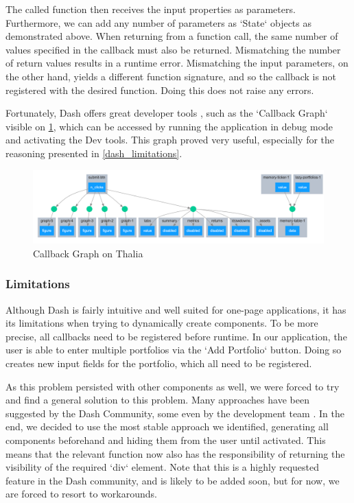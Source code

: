 \documentclass[main.tex]{subfiles}
\begin{document}
The called function then receives the input properties as parameters. Furthermore, we can add any number of parameters as `State` objects as demonstrated above. When returning from a function call, the same number of values specified in the callback must also be returned. Mismatching the number of return values results in a runtime error. Mismatching the input parameters, on the other hand, yields a different function signature, and so the callback is not registered with the desired function. Doing this does not raise any errors.


Fortunately, Dash offers great developer tools \cite{dash_dev_tools}, such as the `Callback Graph` visible on \figurename{\ref{callback_graph}}, which can be accessed by running the application in debug mode and activating the Dev tools. This graph proved very useful, especially for the reasoning presented in \ref{dash_limitations}.

 \begin{figure}[H]
   \centering
   \includegraphics[width=\textwidth,keepaspectratio]{05Coding/05Pictures/callback_graph.png}
   \caption{Callback Graph on Thalia}
   \label{callback_graph}
\end{figure}


\subsubsection*{Limitations}
\label{dash_limitations}

Although Dash is fairly intuitive and well suited for one-page applications, it has its limitations when trying to dynamically create components. To be more precise, all callbacks need to be registered before runtime. In our application, the user is able to enter multiple portfolios via the `Add Portfolio` button. Doing so creates new input fields for the portfolio, which all need to be registered. 

As this problem persisted with other components as well, we were forced to try and find a general solution to this problem. Many approaches have been suggested by the Dash Community, some even by the development team \cite{dash_workaround}. In the end, we decided to use the most stable approach we identified, generating all components beforehand and hiding them from the user until activated. This means that the relevant function now also has the responsibility of returning the visibility of the required `div` element. Note that this is a highly requested feature in the Dash community, and is likely to be added soon, but for now, we are forced to resort to workarounds.
\end{document}
